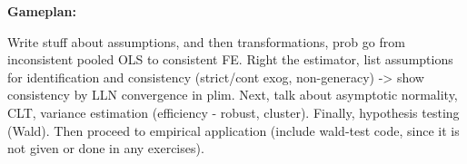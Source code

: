 \textbf{Gameplan:}

Write stuff about assumptions, and then transformations, prob go from inconsistent pooled OLS to consistent FE. Right the estimator, list assumptions for identification and consistency (strict/cont exog, non-generacy) -> show consistency by LLN convergence in plim. Next, talk about asymptotic normality, CLT, variance estimation (efficiency - robust, cluster). Finally, hypothesis testing (Wald). Then proceed to empirical application (include wald-test code, since it is not given or done in any exercises).  